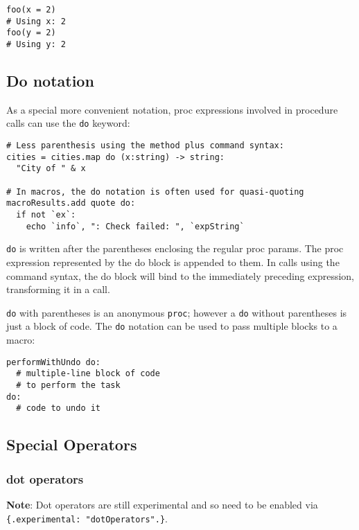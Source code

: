\begin{verbatim}
foo(x = 2)
# Using x: 2
foo(y = 2)
# Using y: 2
\end{verbatim}

\hypertarget{do-notation}{%
\subsection{Do notation}\label{do-notation}}

As a special more convenient notation, proc expressions involved in
procedure calls can use the \texttt{do} keyword:

\begin{verbatim}
# Less parenthesis using the method plus command syntax:
cities = cities.map do (x:string) -> string:
  "City of " & x

# In macros, the do notation is often used for quasi-quoting
macroResults.add quote do:
  if not `ex`:
    echo `info`, ": Check failed: ", `expString`
\end{verbatim}

\texttt{do} is written after the parentheses enclosing the regular proc
params. The proc expression represented by the do block is appended to
them. In calls using the command syntax, the do block will bind to the
immediately preceding expression, transforming it in a call.

\texttt{do} with parentheses is an anonymous \texttt{proc}; however a
\texttt{do} without parentheses is just a block of code. The \texttt{do}
notation can be used to pass multiple blocks to a macro:

\begin{verbatim}
performWithUndo do:
  # multiple-line block of code
  # to perform the task
do:
  # code to undo it
\end{verbatim}

\hypertarget{special-operators}{%
\subsection{Special Operators}\label{special-operators}}

\hypertarget{dot-operators}{%
\subsubsection{dot operators}\label{dot-operators}}

\textbf{Note}: Dot operators are still experimental and so need to be
enabled via \texttt{\{.experimental:\ "dotOperators".\}}.

